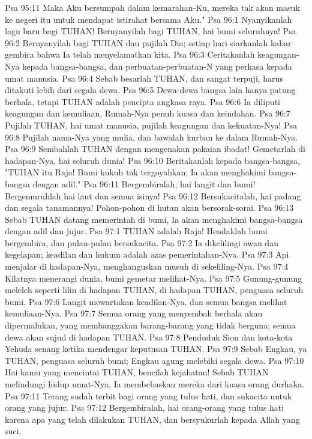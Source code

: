 Psa 95:11  Maka Aku bersumpah dalam kemarahan-Ku, mereka tak akan masuk ke negeri itu untuk mendapat istirahat bersama Aku."
Psa 96:1  Nyanyikanlah lagu baru bagi TUHAN! Bernyanyilah bagi TUHAN, hai bumi seluruhnya!
Psa 96:2  Bernyanyilah bagi TUHAN dan pujilah Dia; setiap hari siarkanlah kabar gembira bahwa Ia telah menyelamatkan kita.
Psa 96:3  Ceritakanlah keagungan-Nya kepada bangsa-bangsa, dan perbuatan-perbuatan-N yang perkasa kepada umat manusia.
Psa 96:4  Sebab besarlah TUHAN, dan sangat terpuji, harus ditakuti lebih dari segala dewa.
Psa 96:5  Dewa-dewa bangsa lain hanya patung berhala, tetapi TUHAN adalah pencipta angkasa raya.
Psa 96:6  Ia diliputi keagungan dan kemuliaan, Rumah-Nya penuh kuasa dan keindahan.
Psa 96:7  Pujilah TUHAN, hai umat manusia, pujilah keagungan dan kekuatan-Nya!
Psa 96:8  Pujilah nama-Nya yang mulia, dan bawalah kurban ke dalam Rumah-Nya.
Psa 96:9  Sembahlah TUHAN dengan mengenakan pakaian ibadat! Gemetarlah di hadapan-Nya, hai seluruh dunia!
Psa 96:10  Beritakanlah kepada bangsa-bangsa, "TUHAN itu Raja! Bumi kukuh tak tergoyahkan; Ia akan menghakimi bangsa-bangsa dengan adil."
Psa 96:11  Bergembiralah, hai langit dan bumi! Bergemuruhlah hai laut dan semua isinya!
Psa 96:12  Bersukacitalah, hai padang dan segala tanamannya! Pohon-pohon di hutan akan bersorak-sorai.
Psa 96:13  Sebab TUHAN datang memerintah di bumi, Ia akan menghakimi bangsa-bangsa dengan adil dan jujur.
Psa 97:1  TUHAN adalah Raja! Hendaklah bumi bergembira, dan pulau-pulau bersukacita.
Psa 97:2  Ia dikelilingi awan dan kegelapan; keadilan dan hukum adalah azas pemerintahan-Nya.
Psa 97:3  Api menjalar di hadapan-Nya, menghanguskan musuh di sekeliling-Nya.
Psa 97:4  Kilatnya menerangi dunia, bumi gemetar melihat-Nya.
Psa 97:5  Gunung-gunung meleleh seperti lilin di hadapan TUHAN, di hadapan TUHAN, penguasa seluruh bumi.
Psa 97:6  Langit mewartakan keadilan-Nya, dan semua bangsa melihat kemuliaan-Nya.
Psa 97:7  Semua orang yang menyembah berhala akan dipermalukan, yang membanggakan barang-barang yang tidak berguna; semua dewa akan sujud di hadapan TUHAN.
Psa 97:8  Penduduk Sion dan kota-kota Yehuda senang ketika mendengar keputusan TUHAN.
Psa 97:9  Sebab Engkau, ya TUHAN, penguasa seluruh bumi; Engkau agung melebihi segala dewa.
Psa 97:10  Hai kamu yang mencintai TUHAN, bencilah kejahatan! Sebab TUHAN melindungi hidup umat-Nya, Ia membebaskan mereka dari kuasa orang durhaka.
Psa 97:11  Terang sudah terbit bagi orang yang tulus hati, dan sukacita untuk orang yang jujur.
Psa 97:12  Bergembiralah, hai orang-orang yang tulus hati karena apa yang telah dilakukan TUHAN, dan bersyukurlah kepada Allah yang suci.
